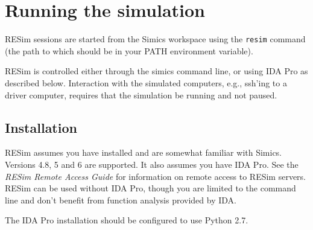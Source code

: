 \documentclass[titlepage]{article}
\begin{document}
\section{Running the simulation}
\label{running}
RESim sessions are started from the Simics workspace using the {\tt resim} command (the path to which should be in your PATH
environment variable).

RESim is controlled either through the simics command line, or using IDA Pro as described below.  Interaction with the simulated
computers, e.g., ssh'ing to a driver computer, requires that the simulation be running and not paused.

\subsection{Installation}
\label{installation}
RESim assumes you have installed and are somewhat familiar with Simics.  Versions 4.8, 5 and 6 are supported.
It also assumes you have IDA Pro. See the \textit{RESim Remote Access Guide} for information on remote access to RESim
servers.  RESim can be used without IDA Pro, though you are limited to the command line and don't benefit from
function analysis provided by IDA.

The IDA Pro installation should be configured to use Python 2.7.
\end{document}
